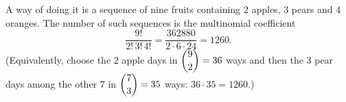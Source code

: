 A way of doing it is a sequence of nine fruits containing $2$ apples, $3$ pears and $4$ oranges. The number of such sequences is the multinomial coefficient
\[
\dfrac{9!}{2!\,3!\,4!}=\dfrac{362880}{2\cdot6\cdot24}=\boxed{1260}.
\]
(Equivalently, choose the $2$ apple days in $\dbinom{9}{2}=36$ ways and then the $3$ pear days among the other $7$ in $\dbinom{7}{3}=35$ ways: $36\cdot35=1260$.)
